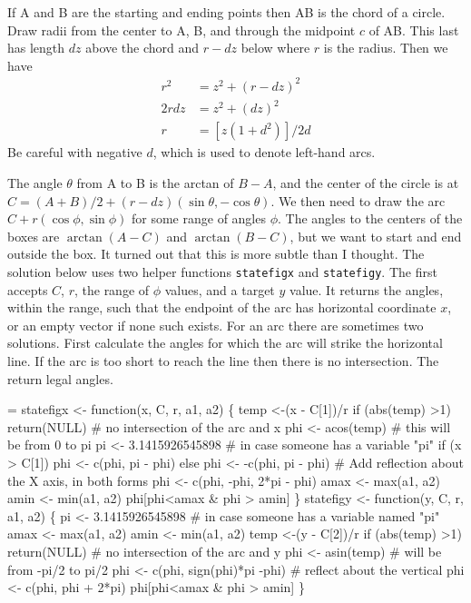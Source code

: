 \documentclass{article}
\newcommand{\code}[1]{\texttt{#1}}
\begin{document}
If A and B are the starting and ending points then AB is the chord of a
circle.  Draw radii from the center to A, B, and through the midpoint $c$ of
AB.  This last has length $dz$ above the chord and $r- dz$ below where $r$
is the radius.  Then we have
\begin{align*}
  r^2 & = z^2 + (r-dz)^2 \\
  2rdz &= z^2 + (dz)^2 \\
  r   &= \left[z (1+ d^2) \right ]/ 2d
\end{align*}
Be careful with negative $d$, which is used to denote left-hand arcs.

The angle $\theta$ from A to B is the arctan of $B-A$,
and the center of the circle is at
$C = (A+B)/2 + (r - dz)(\sin \theta, -\cos \theta)$.
We then need to draw the arc $C + r(\cos \phi, \sin \phi)$ for some range
of angles $\phi$.
The angles to the centers of the boxes are $\arctan(A-C)$ and $\arctan(B-C)$,
but we want to start and end outside the box.
It turned out that this is more subtle than I thought.
The solution below uses two helper functions \code{statefigx} and
\code{statefigy}.
The first accepts $C$, $r$, the range of $\phi$ values, and a target
$y$ value.  It returns the angles, within the range, such that the
endpoint of the arc has horizontal coordinate $x$, or an empty
vector if none such exists.  For an arc there are sometimes two
solutions.
First calculate the angles for which the arc will strike the horizontal
line.  If the arc is too short to reach the line then there is no
intersection. 
The return legal angles.
\begin{nwchunk}
=
 statefigx <- function(x, C, r, a1, a2) \{
     temp <-(x - C[1])/r
     if (abs(temp) >1) return(NULL)  # no intersection of the arc and x
     phi <- acos(temp)  # this will be from 0 to pi
     pi <- 3.1415926545898   # in case someone has a variable "pi" 
     if (x > C[1]) phi <-  c(phi, pi - phi)
     else          phi <- -c(phi, pi - phi)
     # Add reflection about the X axis, in both forms
     phi <- c(phi, -phi, 2*pi - phi) 
     amax <- max(a1, a2)
     amin <- min(a1, a2)
     phi[phi<amax & phi > amin]
 \}
 statefigy <-  function(y, C, r, a1, a2) \{
     pi <- 3.1415926545898   # in case someone has a variable named "pi" 
     amax <- max(a1, a2)
     amin <- min(a1, a2)
     temp <-(y - C[2])/r
     if (abs(temp) >1) return(NULL)  # no intersection of the arc and y
     phi <- asin(temp)  # will be from -pi/2 to pi/2
     phi <- c(phi, sign(phi)*pi -phi)  # reflect about the vertical
     phi <- c(phi, phi + 2*pi)
     phi[phi<amax & phi > amin]
 \}
\end{nwchunk}
\end{document}
